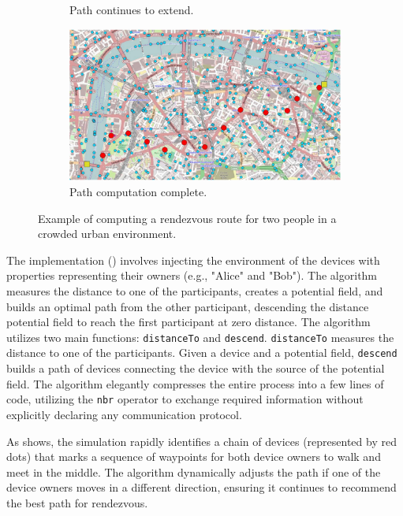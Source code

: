 \begin{figure}[ht!]
\begin{subfigure}[b]{.49\textwidth}
        \caption{Path continues to extend.}
        \label{fig:protelis-example-c}
    \end{subfigure}
    \hfill
    \begin{subfigure}[b]{.49\textwidth}
        \centering
        \includegraphics[width=\textwidth]{figures/protelis-example-d.png}
        \caption{Path computation complete.}
        \label{fig:protelis-example-d}
    \end{subfigure}
    \caption{Example of computing a rendezvous route for two people in a crowded urban environment.}
    \label{fig:protelis-example-map}
\end{figure}

The implementation () involves injecting the environment of the devices with properties representing their owners (e.g., "Alice" and "Bob"). The algorithm measures the distance to one of the participants, creates a potential field, and builds an optimal path from the other participant, descending the distance potential field to reach the first participant at zero distance. The algorithm utilizes two main functions: \texttt{distanceTo} and \texttt{descend}. \texttt{distanceTo} measures the distance to one of the participants. Given a device and a potential field, \texttt{descend} builds a path of devices connecting the device with the source of the potential field. The algorithm elegantly compresses the entire process into a few lines of code, utilizing the \texttt{nbr} operator to exchange required information without explicitly declaring any communication protocol.



As  shows, the simulation rapidly identifies a chain of devices (represented by red dots) that marks a sequence of waypoints for both device owners to walk and meet in the middle. The algorithm dynamically adjusts the path if one of the device owners moves in a different direction, ensuring it continues to recommend the best path for rendezvous.

